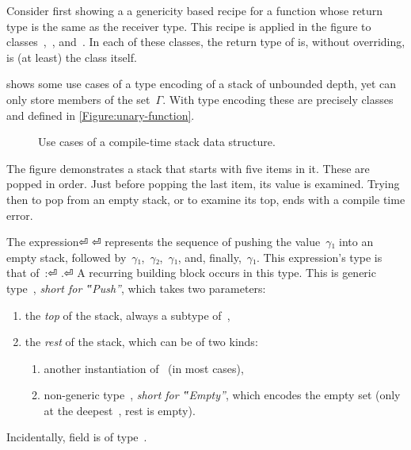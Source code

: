 Consider first  showing a a genericity based recipe for
  a function whose return type
  is the same as the receiver type.
  This recipe is applied in the figure to classes~,~, and~.
  In each of these classes, the return type of  is,
  without overriding, is (at least) the class itself.

 shows some use cases of a type encoding of
  a stack of unbounded depth, yet can only store members of the set~$Γ$.
With type encoding these are precisely classes~
  and  defined in \cref{Figure:unary-function}.

\begin{figure}[!htp]
  \caption{\label{Figure:stack-use-cases}%
    Use cases of a compile-time stack data structure.
  }
\end{figure}

The figure demonstrates a stack that starts with five items in it.
These are popped in order. Just before popping the last item, its
  value is examined.
Trying then to pop from an empty stack, or to examine its top, ends with
  a compile time error.

The expression⏎
  \mbox{\qquad\qquad} ⏎
represents the sequence of pushing the value~$γ₁$ into an
empty stack, followed by~$γ₁$,~$γ₂$,~$γ₁$, and, finally,~$γ₁$.
This expression's type is that of~:⏎
\mbox{\qquad\qquad} .⏎
A recurring building block occurs in this type.
This is generic type~, \emph{short for ‟Push”}, which takes two parameters:
  \begin{enumerate}
    \item the \emph{top} of the stack, always a subtype of~,
    \item the \emph{rest} of the stack, which can be of two kinds:
          \begin{enumerate}
            \item another instantiation of~ (in most cases),
            \item non-generic type~, \emph{short for ‟Empty”}, which encodes the empty
                  set (only at the deepest~, rest is empty).
          \end{enumerate}
  \end{enumerate}
Incidentally,  field  is of type~.

